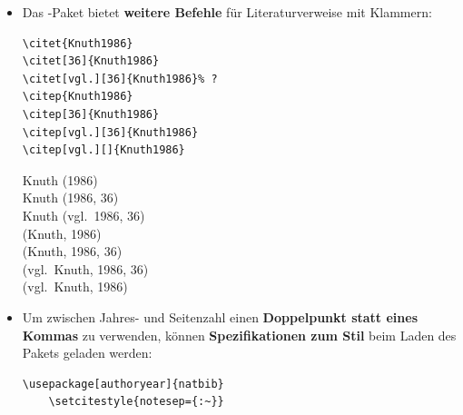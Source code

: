 \begin{frame}[fragile]
\begin{itemize}
	\item Das -Paket bietet \textbf{weitere Befehle} für Literaturverweise mit Klammern:


\begin{multicols}{2}
	
\begin{lstlisting}
\citet{Knuth1986}
\citet[36]{Knuth1986}
\citet[vgl.][36]{Knuth1986}% ?
\citep{Knuth1986}
\citep[36]{Knuth1986}
\citep[vgl.][36]{Knuth1986}
\citep[vgl.][]{Knuth1986}
\end{lstlisting}

Knuth (1986)\\
Knuth (1986, 36)\\
Knuth (vgl.\ 1986, 36)\\
(Knuth, 1986)\\
(Knuth, 1986, 36)\\
(vgl.\ Knuth, 1986, 36)\\
(vgl.\ Knuth, 1986)\\
\end{multicols}

\end{itemize}

\pause

\begin{itemize}
	\item Um zwischen Jahres- und Seitenzahl einen \textbf{Doppelpunkt statt eines Kommas} zu verwenden, können \textbf{Spezifikationen zum Stil} beim Laden des Pakets geladen werden: 
\begin{lstlisting}
\usepackage[authoryear]{natbib}
	\setcitestyle{notesep={:~}}
\end{lstlisting}

\end{itemize}

\end{frame}


